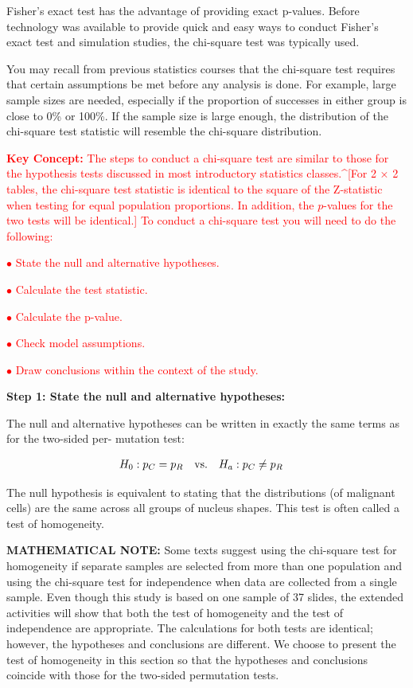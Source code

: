 \documentclass[
]{report}
\begin{document}
Fisher's exact test has the advantage of providing exact p-values. Before technology was available to provide
quick and easy ways to conduct Fisher's exact test and simulation studies, the chi-square test was typically
used.

You may recall from previous statistics courses that the chi-square test requires that certain assumptions
be met before any analysis is done. For example, large sample sizes are needed, especially if the proportion
of successes in either group is close to 0\% or 100\%. If the sample size is large enough, the distribution of the
chi-square test statistic will resemble the chi-square distribution.

\Large

\textbf{\textcolor{red}{Key Concept:}}
\textcolor{red}{The steps to conduct a chi-square test are similar to those for the hypothesis tests discussed in most introductory statistics classes.^[For 2 × 2 tables, the chi-square test statistic is identical to the square of the Z-statistic when testing for equal population proportions. In addition, the $p$-values for the two tests will be identical.] To conduct a chi-square test you will need to do the following:}

\textcolor{red}{$\bullet$ State the null and alternative hypotheses.}

\textcolor{red}{$\bullet$ Calculate the test statistic.}

\textcolor{red}{$\bullet$ Calculate the p-value.}

\textcolor{red}{$\bullet$ Check model assumptions.}

\textcolor{red}{$\bullet$ Draw conclusions within the context of the study.}
\normalsize

\textbf{Step 1: State the null and alternative hypotheses:}

The null and alternative hypotheses can be written in exactly the same terms as for the two-sided per-
mutation test:

\begin{align}
H_0: p_C &= p_R \quad\text{vs.}\quad H_a: p_C \neq p_R 
\notag
\end{align}

The null hypothesis is equivalent to stating that the distributions (of malignant cells) are the same
across all groups of nucleus shapes. This test is often called a test of homogeneity.

\large

\textbf{MATHEMATICAL NOTE:}
Some texts suggest using the chi-square test for homogeneity if separate samples are selected from
more than one population and using the chi-square test for independence when data are collected from
a single sample. Even though this study is based on one sample of 37 slides, the extended activities will
show that both the test of homogeneity and the test of independence are appropriate. The calculations
for both tests are identical; however, the hypotheses and conclusions are different. We choose to present
the test of homogeneity in this section so that the hypotheses and conclusions coincide with those for the
two-sided permutation tests.
\normalsize
\end{document}
